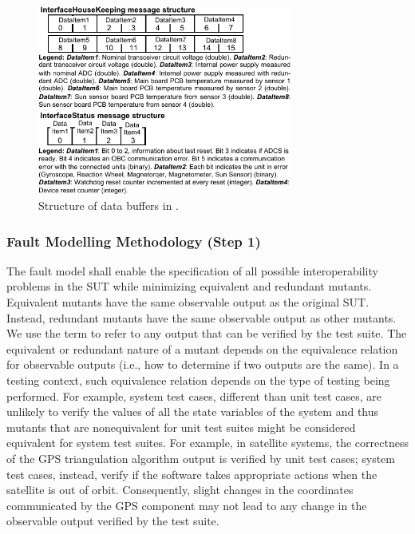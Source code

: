 \begin{figure}
	\centering
		\includegraphics[width=8.4cm]{damat/images/BufferStructuresSmall}
		\caption{Structure of data buffers in \ESAIL.}
		\label{fig:appr:bufferStructure}
	\end{figure}

	

\clearpage


\subsubsection{Fault Modelling Methodology (Step 1)}
\label{sec:methodology}



The fault model shall enable the specification of
all possible interoperability problems in the SUT while minimizing equivalent and redundant mutants.
Equivalent mutants have the same observable output as the original SUT.
Instead, redundant mutants have the same observable output as other mutants.
We use the term  to refer to any output that can be verified by the test suite.
The equivalent or redundant nature of a mutant depends
on the equivalence relation for observable outputs
(i.e., how to determine if two outputs are the same).
In a testing context, such equivalence relation depends on the type of testing being performed. For example, system test cases, different than unit test cases,  are unlikely to verify the values of all the state variables of the system and thus mutants that are nonequivalent for unit test suites might be considered equivalent for system test suites.
For example, in satellite systems, the correctness of the GPS triangulation algorithm output is verified by unit test cases; system test cases, instead, verify
if the software takes appropriate actions when the satellite is out of orbit. Consequently, slight changes in the coordinates communicated by the GPS component may not lead to any change in the observable output verified by the test suite.


